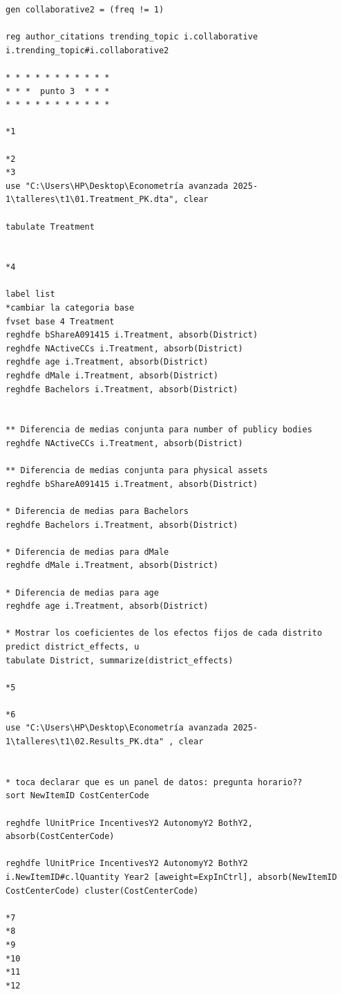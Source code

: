 \documentclass[a4paper, answers, addpoints, 11pt]{exam}
\begin{document}
\begin{verbatim}
gen collaborative2 = (freq != 1)

reg author_citations trending_topic i.collaborative i.trending_topic#i.collaborative2
	
* * * * * * * * * * * 
* * *  punto 3  * * * 
* * * * * * * * * * * 

*1  
 
*2  
*3  
use "C:\Users\HP\Desktop\Econometría avanzada 2025-1\talleres\t1\01.Treatment_PK.dta", clear 

tabulate Treatment


*4

label list 
*cambiar la categoria base
fvset base 4 Treatment
reghdfe bShareA091415 i.Treatment, absorb(District)
reghdfe NActiveCCs i.Treatment, absorb(District)
reghdfe age i.Treatment, absorb(District)
reghdfe dMale i.Treatment, absorb(District)
reghdfe Bachelors i.Treatment, absorb(District)


** Diferencia de medias conjunta para number of publicy bodies
reghdfe NActiveCCs i.Treatment, absorb(District)
 
** Diferencia de medias conjunta para physical assets
reghdfe bShareA091415 i.Treatment, absorb(District) 

* Diferencia de medias para Bachelors
reghdfe Bachelors i.Treatment, absorb(District) 

* Diferencia de medias para dMale
reghdfe dMale i.Treatment, absorb(District) 

* Diferencia de medias para age
reghdfe age i.Treatment, absorb(District) 

* Mostrar los coeficientes de los efectos fijos de cada distrito
predict district_effects, u
tabulate District, summarize(district_effects)

*5 

*6
use "C:\Users\HP\Desktop\Econometría avanzada 2025-1\talleres\t1\02.Results_PK.dta" , clear


* toca declarar que es un panel de datos: pregunta horario??
sort NewItemID CostCenterCode

reghdfe lUnitPrice IncentivesY2 AutonomyY2 BothY2, absorb(CostCenterCode) 

reghdfe lUnitPrice IncentivesY2 AutonomyY2 BothY2 i.NewItemID#c.lQuantity Year2 [aweight=ExpInCtrl], absorb(NewItemID CostCenterCode) cluster(CostCenterCode)

*7
*8
*9
*10
*11
*12
\end{verbatim}
\end{document}
